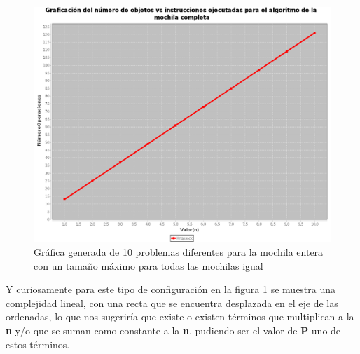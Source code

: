         \begin{figure}[h!]
            \centering
            \includegraphics[width=15cm]{Knapsack/GraficaKnapsack2.png}
            \caption{Gráfica generada de 10 problemas diferentes para la mochila entera con un tamaño máximo para todas las mochilas igual}
            \label{GraficaKnapsack2}
        \end{figure}
        
        Y curiosamente para este tipo de configuración en la figura \ref{GraficaKnapsack2} se muestra una complejidad lineal, con una recta que se encuentra desplazada en el eje de las ordenadas, lo que nos sugeriría que existe o existen términos que multiplican a la \textbf{n} y/o que se suman como constante a la \textbf{n}, pudiendo ser el valor de \textbf{P} uno de estos términos.\\
        
